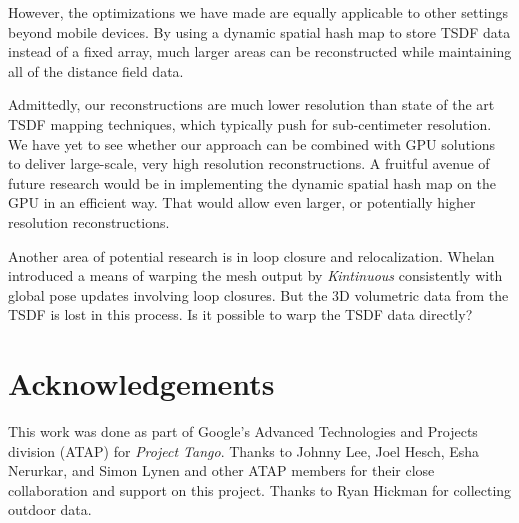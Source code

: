 \documentclass[10pt,twocolumn,letterpaper]{article}
\begin{document}
However, the optimizations we have made are equally applicable to other
settings beyond mobile devices. By using a dynamic spatial hash map to store
TSDF data instead of a fixed array, much larger areas can be reconstructed while
maintaining all of the distance field data.

Admittedly, our reconstructions are much lower resolution than state of the art
TSDF mapping techniques, which typically push for sub-centimeter resolution.
We have yet to see whether our approach can be combined with GPU solutions to deliver
large-scale, very high resolution reconstructions. A fruitful avenue of
future research would be in implementing the dynamic spatial hash map on the GPU
in an efficient way. That would allow even larger, or potentially higher
resolution reconstructions.

Another area of potential research is in loop closure and relocalization.
Whelan \etal\cite{WhelanLoopClose} introduced a means of warping the mesh output
by \textit{Kintinuous} consistently with global pose updates involving loop
closures. But the 3D volumetric data from the TSDF is lost in this process. Is
it possible to warp the TSDF data directly?


\ifcvprfinal
\section*{Acknowledgements}
This work was done as part of Google's Advanced Technologies and Projects
division (ATAP) for \emph{Project Tango}. Thanks to Johnny Lee, Joel Hesch, Esha
Nerurkar, and Simon Lynen and other ATAP members for their close collaboration
and support on this project. Thanks to Ryan Hickman for collecting outdoor data.
\fi


 
\end{document}
